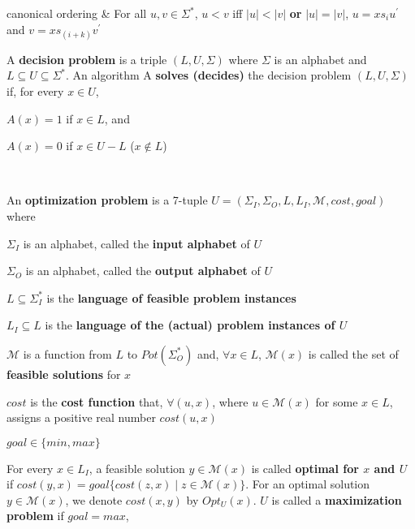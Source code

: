 \begin{tabu}
  canonical \newline ordering & For all $u,v \in \Sigma^*$, $u < v$ iff $| u
  | < | v |$ {\bf or} $| u | = | v |$, $u = xs_iu^\prime$
  and $v = xs_{(i+k)}v^\prime$ \\ \hline
 {A {\bf decision problem} is a triple $(L, U, \Sigma)$ where $\Sigma$ is an
   alphabet and $L \subseteq U \subseteq \Sigma^*$. An algorithm A {\bf solves
     (decides)} the decision problem $(L, U, \Sigma)$ if, for every $x \in U$,
  \begin{enumeratex}
  \item $A(x) = 1$ if $x \in L$, and
  \item $A(x) = 0$ if $x \in U - L$ ($x \notin L$)
  \end{enumeratex}
  } \\ \hline
 {An {\bf optimization problem} is a 7-tuple $U = (\Sigma_I, \Sigma_O, L, L_I,
   \mathcal{M}, cost, goal)$ where
   \begin{enumeratex}
   \item $\Sigma_I$ is an alphabet, called the {\bf input alphabet} of $U$
   \item $\Sigma_O$ is an alphabet, called the {\bf output alphabet} of $U$
   \item $L \subseteq \Sigma_I^*$ is the {\bf language of feasible problem
     instances}
   \item $L_I \subseteq L$ is the {\bf language of the (actual) problem
     instances of $U$}
   \item $\mathcal{M}$ is a function from $L$ to $Pot(\Sigma_O^*)$ and, $\forall
     x \in L$, $\mathcal{M}(x)$ is called the set of {\bf feasible solutions}
     for $x$
   \item $cost$ is the {\bf cost function} that, $\forall (u, x)$, where
     $u \in \mathcal{M}(x)$ for some $x \in L$, assigns a positive real number
     $cost(u, x)$
   \item $goal \in \{min, max\}$
   \end{enumeratex}
   For every $x \in L_I$, a feasible solution $y \in \mathcal{M}(x)$ is called
   {\bf optimal for $x$ and $U$} if $cost(y, x) = goal\{cost(z,x) \mid z \in
   \mathcal{M}(x)\}$. \newline
   For an optimal solution $y \in \mathcal{M}(x)$, we denote $cost(x,y)$ by
   $Opt_U(x)$. $U$ is called a {\bf maximization problem} if $goal = max$,
}
\end{tabu}
